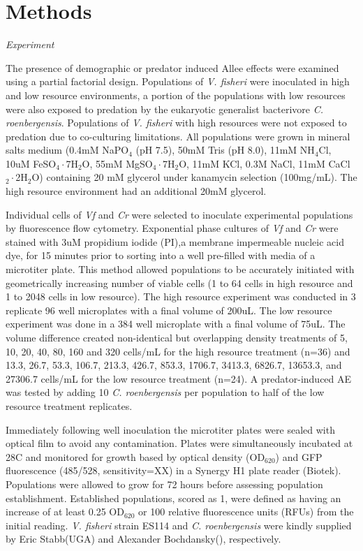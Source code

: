 \documentclass[a4paper,10pt]{article}
\begin{document}
\section{Methods}
\textit{Experiment}

The presence of demographic or predator induced Allee effects were examined using a partial factorial design. Populations of \textit{V. fisheri} were inoculated in high and low resource environments, a portion of the populations with low resources were also exposed to predation by the eukaryotic generalist bacterivore \textit{C. roenbergensis}. Populations of \textit{V. fisheri} with high resources were not exposed to predation due to co-culturing limitations. All populations were grown in mineral salts medium (0.4mM NaPO$_{4}$ (pH 7.5), 50mM Tris (pH 8.0), 11mM NH$_{4}$Cl, 10uM  FeSO$_{4}\cdot$7H$_{2}$O, 55mM MgSO$_{4}\cdot$7H$_{2}$O, 11mM KCl, 0.3M NaCl, 11mM CaCl$_{2}\cdot$2H$_{2}$O) containing 20 mM glycerol under kanamycin selection (100mg/mL). The high resource environment had an additional 20mM glycerol. 

Individual cells of \textit{Vf} and \textit{Cr} were selected to inoculate experimental populations by fluorescence flow cytometry. Exponential phase cultures of \textit{Vf} and \textit{Cr} were stained with 3uM propidium iodide (PI),a membrane impermeable nucleic acid dye, for 15 minutes prior to sorting into a well pre-filled with media of a microtiter plate. This method allowed populations to be accurately initiated with geometrically increasing number of viable cells (1 to 64 cells in high resource and 1 to 2048 cells in low resource). The high resource experiment was conducted in 3 replicate 96 well microplates with a final volume of 200uL. The low resource experiment was done in a 384 well microplate with a final volume of 75uL. The volume difference created non-identical but overlapping density treatments of 5, 10, 20, 40, 80, 160 and 320 cells/mL for the high resource treatment (n=36) and  13.3, 26.7, 53.3, 106.7, 213.3, 426.7, 853.3, 1706.7, 3413.3, 6826.7, 13653.3, and 27306.7 cells/mL for the low resource treatment (n=24). A predator-induced AE was tested by adding 10 \textit{C. roenbergensis} per population to half of the low resource treatment replicates.  

Immediately following well inoculation the microtiter plates were sealed with optical film to avoid any contamination. Plates were simultaneously incubated at 28C and monitored for growth based by optical density (OD$_{620}$) and GFP fluorescence (485/528, sensitivity=XX) in a Synergy H1 plate reader (Biotek). Populations were allowed to grow for 72 hours before assessing population establishment. Established populations, scored as 1, were defined as having an increase of at least 0.25 OD$_{620}$ or 100 relative fluorescence units (RFUs) from the initial reading.  \textit{V. fisheri} strain ES114  and \textit{C. roenbergensis} were kindly supplied by Eric Stabb(UGA) and Alexander Bochdansky(), respectively.	
	
\end{document}
